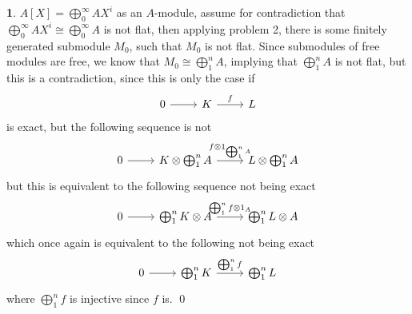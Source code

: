 \documentclass[11pt]{article}
\theoremstyle{definition}
\newtheorem{pb}{}
\begin{document}
    \begin{pb}
        \color{red}
        \(A[X] = \bigoplus_0^\infty AX^i\) as an \(A\)-module, assume for contradiction that \(\bigoplus_0^\infty AX^i \cong \bigoplus_0^\infty A\) is not flat, then applying problem 2, there is some finitely generated submodule \(M_0\), such that \(M_0\) is not flat. Since submodules of free modules are free, we know that \(M_0 \cong \bigoplus_1^n A\), implying that \(\bigoplus_1^n A\) is not flat, but this is a contradiction, since this is only the case if
        \begin{equation*}
            \begin{tikzcd}
                0 \arrow[r,"{}"] &K \arrow[r,"{f}"] &L
            \end{tikzcd}
        \end{equation*}
        is exact, but the following sequence is not
        \begin{equation*}
            \begin{tikzcd}
                0 \arrow[r,"{}"] &K \otimes \bigoplus_1^n A \arrow[r,"{f \otimes 1_{\bigoplus_1^n A}}"] &L \otimes \bigoplus_1^n A
            \end{tikzcd}
        \end{equation*}
        but this is equivalent to the following sequence not being exact
        \begin{equation*}
            \begin{tikzcd}
                0 \arrow[r,"{}"]& \bigoplus_1^n K\otimes A \arrow[r,"{\bigoplus_1^n f \otimes 1_A}"] &\bigoplus_1^n L\otimes A
            \end{tikzcd}
        \end{equation*}
        which once again is equivalent to the following not being exact
        \begin{equation*}
            \begin{tikzcd}
                0 \arrow[r,"{}"] & \bigoplus_1^n K \arrow[r,"{\bigoplus_1^n f}"] & \bigoplus_1^n L
            \end{tikzcd}
        \end{equation*}
        where \(\bigoplus_1^n f\) is injective since \(f\) is. \qed


\end{pb}
\end{document}
